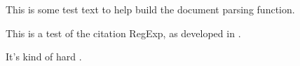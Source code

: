 \citet{ramchand1949} This is some test text to help build the document parsing function.

This is a test of the citation RegExp, as developed in \citet{crum2020}.

It's kind of hard \citep{smith1998}.
